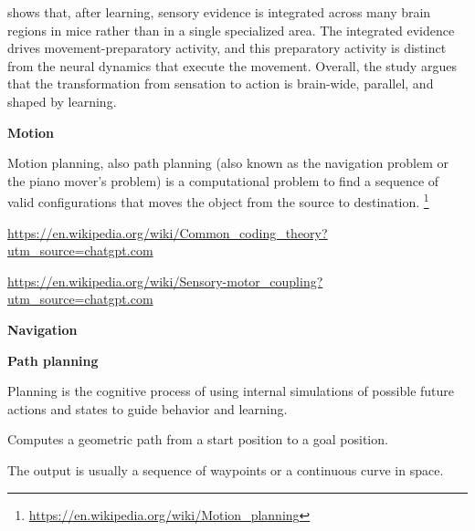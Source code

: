 \documentclass{book}
\providecommand{\ProjectDeepHeading}[2]{%
    \par\medskip\noindent\textbf{#2}\par\smallskip
}
\providecommand{\seeherefooter}[1]{\footnote{\url{#1}}}
\begin{document}
    \cite{khilkevich-2024-brain-wide-dynamics-linking-sensation-to-action-during-decision-making}  shows that, after learning, sensory evidence is integrated across many brain regions in mice rather than in a single specialized area. The integrated evidence drives movement-preparatory activity, and this preparatory activity is distinct from the neural dynamics that execute the movement. Overall, the study argues that the transformation from sensation to action is brain-wide, parallel, and shaped by learning.

\ProjectDeepHeading{6}{Motion}


Motion planning, also path planning (also known as the navigation problem or the piano mover's problem) is a computational problem to find a sequence of valid configurations that moves the object from the source to destination.
    \seeherefooter{https://en.wikipedia.org/wiki/Motion_planning}


\url{https://en.wikipedia.org/wiki/Common_coding_theory?utm_source=chatgpt.com}
    
    \url{https://en.wikipedia.org/wiki/Sensory-motor_coupling?utm_source=chatgpt.com}

\ProjectDeepHeading{7}{Navigation}


%

\ProjectDeepHeading{8}{Path planning}


\cite{mattar-2026-planning-in-the-brain-its-not-what-you-think-it-is}
   Planning is the cognitive process of using internal simulations of possible future actions and states to guide behavior and learning.

   Computes a geometric path from a start position to a goal position.

   The output is usually a sequence of waypoints or a continuous curve in space.
\end{document}
